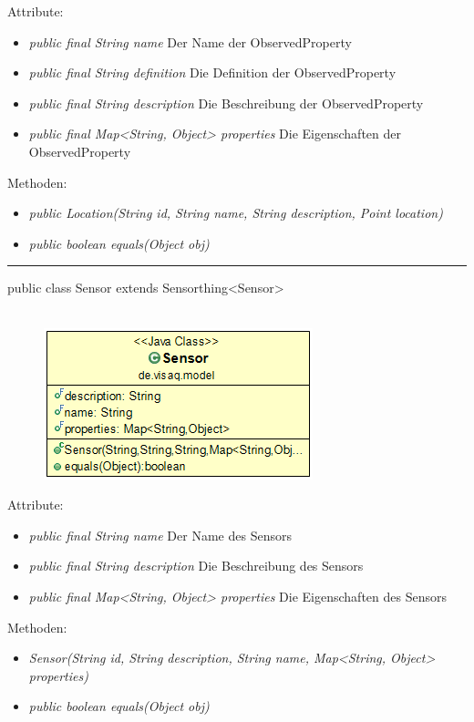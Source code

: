 Attribute:
\begin{itemize}
	\item \emph{public final String name} Der Name der ObservedProperty
	\item \emph{public final String definition} Die Definition der ObservedProperty
	\item \emph{public final String description} Die Beschreibung der ObservedProperty
	\item \emph{public final Map<String, Object> properties} Die Eigenschaften der ObservedProperty
\end{itemize}
Methoden:
\begin{itemize}
	\item \emph{public Location(String id, String name, String description, Point location)} 
	\item \emph{public boolean equals(Object obj)} 
\end{itemize}

\rule{\textwidth}{0.4pt}
public class Sensor extends Sensorthing<Sensor>
\\\\
\begin{minipage}{0.3\textwidth}
	\begin{figure}[H]
		\includegraphics[scale = 0.5
		]{media/frontend/model/SensorClass.png}
	\end{figure}
\end{minipage} \hfill
\begin{minipage}{0.6\textwidth}
\end{minipage}

Attribute:
\begin{itemize}
	\item \emph{public final String name} Der Name des Sensors
	\item \emph{public final String description} Die Beschreibung des Sensors
	\item \emph{public final Map<String, Object> properties} Die Eigenschaften des Sensors
\end{itemize}
Methoden:
\begin{itemize}
	\item \emph{Sensor(String id, String description, String name, Map<String, Object> properties)} 
	\item \emph{public boolean equals(Object obj)} 
\end{itemize}

